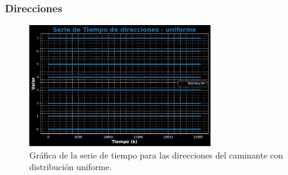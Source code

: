 \documentclass[11pt]{article} %
\begin{document}
	 \subsubsection{Direcciones}
	 \begin{figure}[h]
	 	\centering
	 	\includegraphics[width=0.7\textwidth]{graf_direcciones_uniforme.pdf}
	 	\caption{Gráfica de la serie de tiempo para las direcciones del caminante con distribución uniforme.}
	 	\label{fig:direcUnifGraf}
	 \end{figure}
\end{document}
